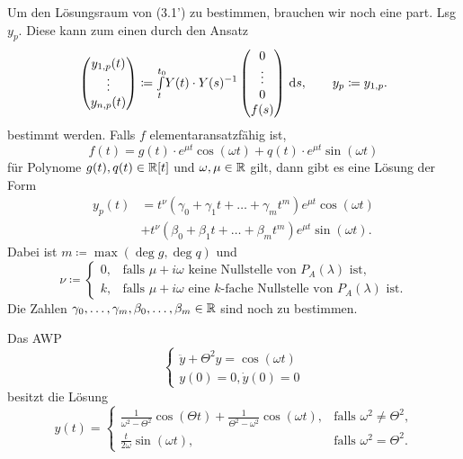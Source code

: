 \documentclass{cheat-sheet}
\begin{document}
\begin{bem}
  Um den Lösungsraum von (3.1') zu bestimmen, brauchen wir noch eine part. Lsg $y_p$.
  Diese kann zum einen durch den Ansatz
  \[
    \begin{pmatrix}
      y_{1,p}(t)\\
      \vdots\\
      y_{n,p}(t)
    \end{pmatrix} \coloneqq {\textstyle \int\limits_{t}^{t_0}} Y(t) \cdot Y(s)^{-1} \begin{pmatrix}
      0\\ \vdots \\ 0 \\ f(s)
    \end{pmatrix} \,\mathrm{d} s, \qquad
    y_p \coloneqq y_{1,p}.
  \]
  bestimmt werden. Falls $f$ elementaransatzfähig ist, \dh{}
  \[ f(t) = g(t) \cdot e^{\mu t} \cos(\omega t) + q(t) \cdot e^{\mu t} \sin(\omega t) \]
  für Polynome $g(t), q(t) \in \mathbb{R}[t]$ und $\omega, \mu \in \mathbb{R}$ gilt, dann gibt es eine Lösung der Form
  \begin{align*}
    y_p(t) &= t^{\nu} (\gamma_0 + \gamma_1 t + \ldots + \gamma_m t^m) e^{\mu t} \cos(\omega t)\\
    & + t^{\nu} (\beta_0 + \beta_1 t + \ldots + \beta_m t^m) e^{\mu t} \sin(\omega t).
  \end{align*}
  Dabei ist $m \coloneqq \max(\deg g, \deg q)$ und
  \[
    \nu \coloneqq \begin{cases}
      0, & \text{falls $\mu + i \omega$ keine Nullstelle von $P_A(\lambda)$ ist,}\\
      k, & \text{falls $\mu + i \omega$ eine $k$-fache Nullstelle von $P_A(\lambda)$ ist}.
    \end{cases}
  \]
  Die Zahlen $\gamma_0, \ldots, \gamma_m, \beta_0, \ldots, \beta_m \in \mathbb{R}$ sind noch zu bestimmen.
\end{bem}

\begin{bsp}
  Das AWP
  \[
    \left\{ \begin{array}{ll}
      \ddot{y} + \Theta^2 y = \cos(\omega t)\\
      y(0) = 0, \dot{y}(0) = 0
    \end{array} \right.
  \]
  besitzt die Lösung
  \[
    y(t) = \begin{cases}
      \tfrac{1}{\omega^2 - \Theta^2} \cos(\Theta t) + \tfrac{1}{\Theta^2 - \omega^2} \cos(\omega t), &\text{falls $\omega^2 \not= \Theta^2$,}\\
      \tfrac{t}{2 \omega} \sin(\omega t), &\text{falls $\omega^2 = \Theta^2$.}
    \end{cases}
  \]
\end{bsp}
\end{document}
